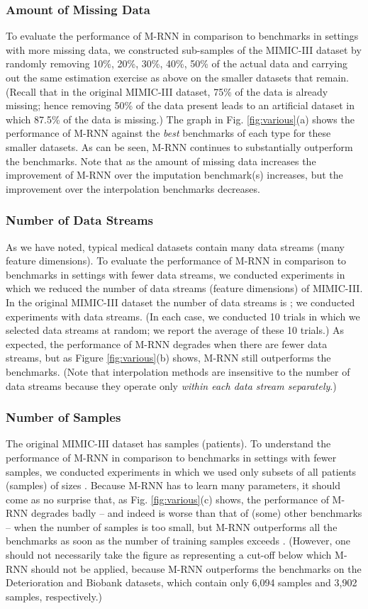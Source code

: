 \documentclass{article}
\begin{document}
\subsubsection{Amount of Missing Data}  To evaluate the performance of M-RNN in comparison to benchmarks in settings with more missing data, we constructed sub-samples of the MIMIC-III dataset by randomly removing 10\%, 20\%, 30\%, 40\%, 50\% of the actual data and carrying out the same estimation exercise as above on the smaller datasets that remain. (Recall that in the original MIMIC-III dataset, 75\% of the data is already missing; hence removing 50\% of the data present leads to an artificial dataset in which 87.5\% of the data is missing.)  The graph in Fig. \ref{fig:various}(a) shows the performance of M-RNN against the {\em best} benchmarks of each type for these smaller datasets.  As can be seen, M-RNN continues to substantially outperform the benchmarks.  Note that as the amount of missing data increases the improvement of M-RNN over the imputation benchmark(s) increases, but the improvement over the interpolation benchmarks decreases. 

\subsubsection{Number of Data Streams} As we have noted, typical medical datasets contain many data streams (many feature dimensions).  To evaluate the performance of M-RNN in comparison to benchmarks in settings with fewer data streams, we conducted experiments in which we reduced the number of data streams (feature dimensions) of MIMIC-III.  In the original MIMIC-III dataset the number of data streams is ; we conducted experiments with   data streams.  (In each case, we conducted 10 trials in which we selected data streams at random; we report the average of these 10 trials.)   As expected, the performance of M-RNN degrades when there are fewer data streams, but as Figure \ref{fig:various}(b) shows, M-RNN still outperforms the benchmarks.  (Note that interpolation methods are insensitive to the number of data streams because they operate only {\em within each data stream separately}.)  


\subsubsection{Number of Samples} The original MIMIC-III dataset has  samples (patients).  To understand the performance of M-RNN in comparison to benchmarks in settings with fewer samples, we conducted experiments in which we used only subsets of all patients (samples) of sizes .   Because M-RNN has to learn many parameters, it should come as no surprise that, as Fig. \ref{fig:various}(c) shows, the performance of M-RNN degrades badly -- and indeed is worse than that of (some) other benchmarks -- when the number of samples is too small, but M-RNN outperforms all the benchmarks as soon as the  number of training samples exceeds .  (However, one should not necessarily take the figure  as representing a cut-off below which M-RNN should not be applied, because  M-RNN outperforms the benchmarks on the Deterioration and Biobank datasets, which contain only 6,094 samples  and 3,902 samples, respectively.)
\end{document}
